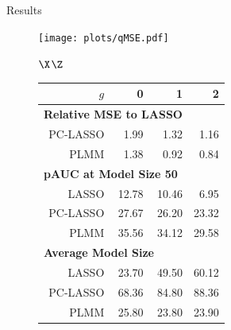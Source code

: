\documentclass[final]{beamer}
\newlength{\sepwidth}
\newlength{\colwidth}
\newcommand{\separatorcolumn}{\begin{column}{\sepwidth}\end{column}}
\begin{document}
\begin{frame}[t]
\begin{columns}[t]
\begin{column}{\colwidth}
\begin{block}{Results}
        \begin{figure}[h!]
          \begin{minipage}{0.5\textwidth}
            \centering
            \texttt{[image: plots/qMSE.pdf]} 
          \end{minipage}
          \hspace{0.1cm} %
          \begin{minipage}{0.45\textwidth}
            $\X$\text{, }$\Z$
            \large{
              \begin{tabular}{rrrr}
                \hline
                $g$ & 0 & 1 & 2 \\
                \hline
                \multicolumn{3}{l}{\textbf{Relative MSE to LASSO}} \\
                \quad PC-LASSO & 1.99 & 1.32 & 1.16 \\
                \quad PLMM     & 1.38 & 0.92 & 0.84 \\
                \multicolumn{3}{l}{\textbf{pAUC at Model Size 50}} \\
                \quad LASSO    & 12.78 & 10.46 & 6.95 \\
                \quad PC-LASSO & 27.67 & 26.20 & 23.32 \\
                \quad PLMM     & 35.56 & 34.12 & 29.58 \\
                \multicolumn{3}{l}{\textbf{Average Model Size}} \\
                \quad LASSO    & 23.70 & 49.50 & 60.12 \\
                \quad PC-LASSO & 68.36 & 84.80 & 88.36 \\
                \quad PLMM     & 25.80 & 23.80 & 23.90 \\
                \hline
              \end{tabular}
            }
          \end{minipage}
        \end{figure}
        
      \end{block}

    \end{column}

    \separatorcolumn
  \end{columns}
\end{frame}
\end{document}
